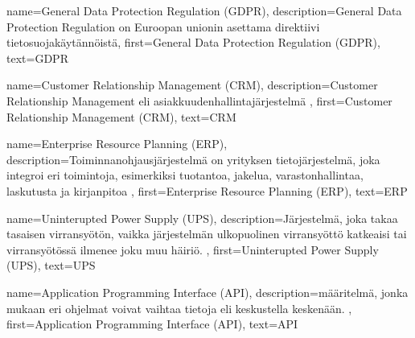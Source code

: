 %
%
%

\makeglossaries


    {
    name={General Data Protection Regulation (GDPR)},
	description={General Data Protection Regulation on Euroopan unionin asettama direktiivi tietosuojakäytännöistä},
	first={General Data Protection Regulation (GDPR)},
	text={GDPR}
    }

    {
	name={Customer Relationship Management (CRM)},
	description={Customer Relationship Management eli asiakkuudenhallintajärjestelmä \cite{crm, crm2}},
	first={Customer Relationship Management (CRM)},
	text={CRM}
    }

    {
    name={Enterprise Resource Planning (ERP)},
    description={Toiminnanohjausjärjestelmä on yrityksen tietojärjestelmä, joka integroi eri toimintoja, esimerkiksi tuotantoa, jakelua, varastonhallintaa, laskutusta ja kirjanpitoa \cite{erp}},
    first={Enterprise Resource Planning (ERP)},
    text={ERP}
    }

    {
    name={Uninterupted Power Supply (UPS)},
    description={Järjestelmä, joka takaa tasaisen virransyötön, vaikka järjestelmän ulkopuolinen virransyöttö katkeaisi tai virransyötössä ilmenee joku muu häiriö. \cite{ups}},
    first={Uninterupted Power Supply (UPS)},
    text={UPS}
    }

    {
    name={Application Programming Interface (API)},
    description={määritelmä, jonka mukaan eri ohjelmat voivat vaihtaa tietoja eli keskustella keskenään. \cite{api}},
    first={Application Programming Interface (API)},
    text={API}
    }

